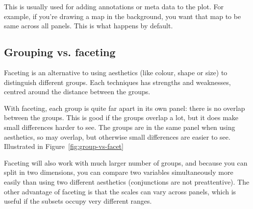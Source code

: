 This is usually used for adding annotations or meta data to the plot.  For example, if you're drawing a map in the background, you want that map to be same across all panels.  This is what happens by default.

% 
% 
% 


\subsection{Grouping vs. faceting}
\label{sub:group-vs-facet}

Faceting is an alternative to using aesthetics (like colour, shape or size) to distinguish different groups.  Each techniques has strengths and weaknesses, centred around the distance between the groups.

With faceting, each group is quite far apart in its own panel: there is no overlap between the groups.  This is good if the groups overlap a lot, but it does make small differences harder to see.  The groups are in the same panel when using aesthetics, so may overlap, but otherwise small differences are easier to see.  Illustrated in Figure~\ref{fig:group-vs-facet}

Faceting will also work with much larger number of groups, and because you can split in two dimensions, you can compare two variables simultaneously more easily than using two different aesthetics (conjunctions are not preattentive).  The other advantage of faceting is that the scales can vary across panels, which is useful if the subsets occupy very different ranges.

% 
%
% 


